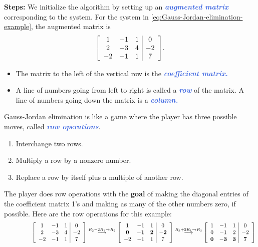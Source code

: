 \documentclass[10pt]{article}
\newcommand{\demph}[1]{\textcolor{RoyalBlue}{\textbf{\slshape #1}}} %
\newenvironment{augmentedmatrix}[1] %
{\left[\begin{array}{#1}}
    {\end{array}\right]}
\theoremstyle{definition}
\newcommand{\Fl}[1]{\vspace{5mm}\noindent\textbf{#1}}%
\begin{document}
\Fl{Steps:} We initialize the algorithm by setting up an \demph{augmented
  matrix} corresponding to the system. For the system in
\eqref{eq:Gauss-Jordan-elimination-example}, the augmented matrix is
\begin{equation*}
  \begin{augmentedmatrix}{ccc|c}
    1& -1& 1& 0 \\
    2& -3& 4& -2 \\
    -2& -1& 1& 7
  \end{augmentedmatrix}.
\end{equation*}
\begin{itemize}
  \item The matrix to the left of the vertical row is the \demph{coefficient matrix.}
  \item A line of numbers going from left to right is called a \demph{row} of
  the matrix. A line of numbers going down the matrix is a \demph{column.}
\end{itemize}
Gauss-Jordan elimination is like a game where the player has three possible
moves, called \demph{row operations}.
\begin{enumerate}
  \item Interchange two rows.
  \item Multiply a row by a nonzero number.
  \item Replace a row by itself plus a multiple of another row.
\end{enumerate}
The player does row operations with the \textbf{goal} of making the diagonal
entries of the coefficient matrix 1's and making as many of the other numbers
zero, if possible. Here are the row operations for this example:
\begin{equation*}
  \phantom{ \overset{R_{2}-2R_{1}\to R_{2}}{\longrightarrow}}
  \begin{augmentedmatrix}{ccc|c}
    1& -1& 1& 0 \\
    2& -3& 4& -2 \\
    -2& -1& 1& 7
  \end{augmentedmatrix}
  \overset{R_{2}-2R_{1}\to R_{2}}{\longrightarrow}
  \begin{augmentedmatrix}{ccc|c}
    1& -1& 1& 0 \\
    \mathbf{0}& \mathbf{-1}& \mathbf{2}& \mathbf{-2} \\
    -2& -1& 1& 7
  \end{augmentedmatrix}
  \overset{R_{3}+2R_{1} \to R_{3}}{\longrightarrow}
  \begin{augmentedmatrix}{ccc|c}
    1& -1& 1& 0 \\
    0& -1& 2& -2 \\
    \mathbf{0}& \mathbf{-3}& \mathbf{3}& \mathbf{7}
  \end{augmentedmatrix}
\end{equation*}
\end{document}
